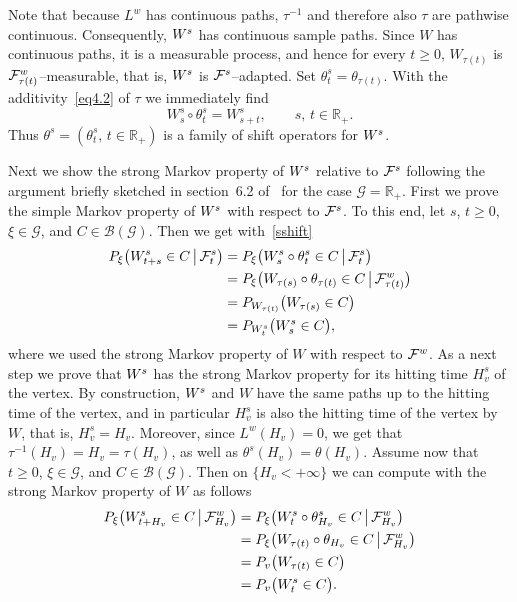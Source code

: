 \documentclass[11pt,a4paper]{amsart}
\newcommand{\cB}{\mathcal{B}}
\newcommand{\cF}{\mathcal{F}}
\newcommand{\cG}{\mathcal{G}}
\newcommand{\1}{1}
\newcommand{\R}{\mathbb{R}}
\theoremstyle{remark}
\let\comp\circ
\newcommand{\cond}{\ensuremath\,\big|\,}
\newcommand{\cFW}{\ensuremath \cF^w}
\newcommand{\Ws}{\ensuremath W^s}
\newcommand{\cFsW}{\ensuremath \cF^s}
\numberwithin{equation}{section}
\begin{document}
Note that because $L^w$ has continuous paths, $\tau^{-1}$ and therefore also $\tau$
are pathwise continuous. Consequently, $\Ws$ has continuous sample paths. Since $W$
has continuous paths, it is a measurable process, and hence for every $t\ge 0$,
$W_{\tau(t)}$ is $\cFW_{\tau(t)}$--measurable, that is, $\Ws$ is $\cFsW$--adapted.
Set $\theta^s_t = \theta_{\tau(t)}$. With the additivity~\eqref{eq4.2} of $\tau$ we
immediately find
\begin{equation} \label{sshift}
    W^s_s\comp\theta^s_t = W^s_{s+t},\qquad s,\,t\in\R_+.
\end{equation}
Thus $\theta^s=(\theta^s_t,\,t\in\R_+)$ is a family of shift operators for $\Ws$.

Next we show the strong Markov property of $\Ws$ relative to $\cFsW$ following the
argument briefly sketched in section~6.2 of~\cite{Kn81} for the case $\cG=\R_+$.
First we prove the simple Markov property of $\Ws$ with respect to $\cFsW$. To this
end, let $s$, $t\ge 0$, $\xi\in\cG$, and $C\in\cB(\cG)$. Then we get
with~\eqref{sshift}
\begin{align*}
    P_\xi\bigl(\Ws_{t+s}\in C\cond \cFsW_t\bigr)
        &= P_\xi\bigl(\Ws_s\comp\theta^s_t\in C\cond \cFsW_t\bigr)\\
        &= P_\xi\bigl(W_{\tau(s)}\comp\theta_{\tau(t)}\in C\cond \cFW_{\tau(t)}\bigr)\\
        &= P_{W_{\tau(t)}} \bigl(W_{\tau(s)}\in C\bigr)\\
        &= P_{\Ws_t}\bigl(\Ws_s\in C\bigr),
\end{align*}
where we used the strong Markov property of $W$ with respect to $\cFW$. As a next
step we prove that $\Ws$ has the strong Markov property for its hitting time $H^s_v$
of the vertex. By construction, $\Ws$ and $W$ have the same paths up to the hitting
time of the vertex, and in particular  $H^s_v$ is also the hitting time of the vertex
by $W$, that is, $H^s_v=H_v$. Moreover, since $L^w(H_v)=0$, we get that
$\tau^{-1}(H_v) = H_v = \tau(H_v)$, as well as $\theta^s(H_v) = \theta(H_v)$.
Assume now that $t\ge 0$, $\xi\in\cG$, and $C\in\cB(\cG)$. Then on $\{H_v<+\infty\}$
we can compute with the strong Markov property of $W$ as follows
\begin{align*}
    P_\xi\bigl(\Ws_{t+H_v}\in C \cond \cFW_{H_v}\bigr)
        &= P_\xi\bigl(\Ws_t\comp\theta^s_{H_v}\in C\cond \cFW_{H_v}\bigr)\\
        &= P_\xi\bigl(W_{\tau(t)}\comp\theta_{H_v}\in C\cond  \cFW_{H_v}\bigr)\\
        &= P_v\bigl(W_{\tau(t)}\in C\bigr)\\
        &= P_v\bigl(\Ws_t\in C\bigr).
\end{align*}
\end{document}

